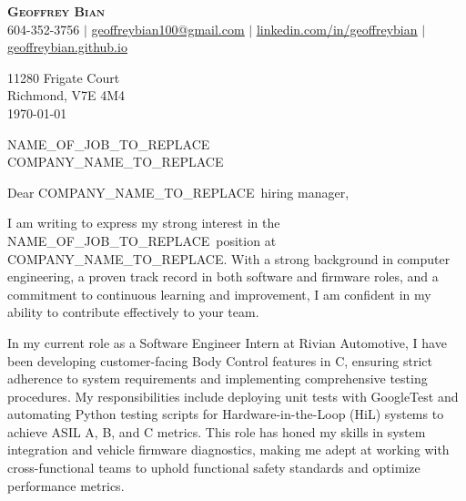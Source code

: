 \documentclass[letterpaper,11pt]{article}
\newcommand{\companyname}{COMPANY_NAME_TO_REPLACE}
\newcommand{\nameofjob}{NAME_OF_JOB_TO_REPLACE}
\begin{document}
\begin{center}
    \textbf{\Huge \scshape Geoffrey Bian} \\ \vspace{5pt}
    \small 604-352-3756 $|$ \href{mailto:geoffreybian100@gmail.com}{\underline{geoffreybian100@gmail.com}} $|$ 
    \href{https://linkedin.com/in/geoffreybian}{\underline{linkedin.com/in/geoffreybian}} $|$ 
    \href{https://geoffreybian.github.io/}{\underline{geoffreybian.github.io}}
\end{center}

\vspace{2pt}

11280 Frigate Court \\
Richmond, V7E 4M4 \\
\today \\

\vspace{10pt}

\nameofjob \\
\companyname \\

\vspace{15pt}

Dear \companyname \ hiring manager,

\vspace{15pt}

I am writing to express my strong interest in the \nameofjob \ position at \companyname. With a strong background in computer engineering, a proven track record in both software and firmware roles, and a commitment to continuous learning and improvement, I am confident in my ability to contribute effectively to your team.

\vspace{10pt}

In my current role as a Software Engineer Intern at Rivian Automotive, I have been developing customer-facing Body Control features in C, ensuring strict adherence to system requirements and implementing comprehensive testing procedures. My responsibilities include deploying unit tests with GoogleTest and automating Python testing scripts for Hardware-in-the-Loop (HiL) systems to achieve ASIL A, B, and C metrics. This role has honed my skills in system integration and vehicle firmware diagnostics, making me adept at working with cross-functional teams to uphold functional safety standards and optimize performance metrics.

\vspace{10pt}
\end{document}

